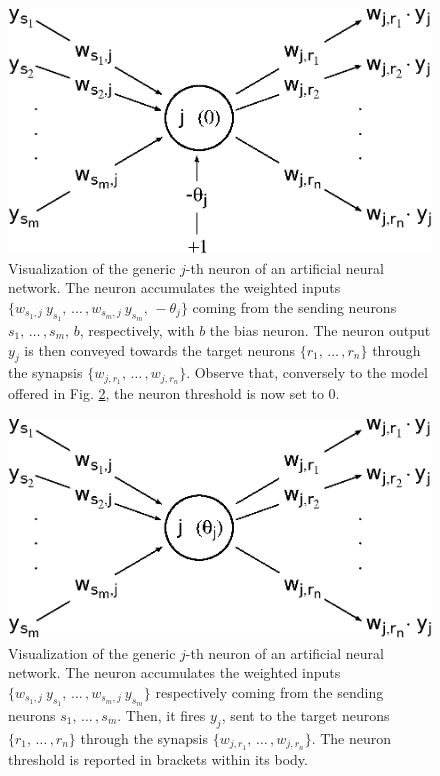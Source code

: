 \documentclass{elsarticle}
\numberwithin{equation}{section}
\theoremstyle{theorem}
\theoremstyle{definition}
\theoremstyle{remark}
\theoremstyle{proposition}
\numberwithin{figure}{section}
\begin{document}
		\begin{figure}[H]
			\center
			\includegraphics[scale = 0.6]{neural_model_bias.eps}
			
			\caption{Visualization of the generic $j$-th neuron of an artificial neural network. The neuron accumulates the weighted inputs $\big\lbrace w_{s_1,j} ~ y_{s_1}, \, \ldots \, , w_{s_m,j} ~ y_{s_m}, \, -\theta_j \big\rbrace$ coming from the sending neurons $s_1, \, \ldots \, , s_m, \, b$, respectively, with $b$ the bias neuron. The neuron output $y_j$ is then conveyed towards the target neurons $\big\lbrace r_1, \, \ldots \, , r_n \big\rbrace$ through the synapsis $\big\lbrace w_{j,r_1}, \, \ldots \, , w_{j,r_n} \big\rbrace$. Observe that, conversely to the model offered in Fig. \ref{fig:neural-model}, the neuron threshold is now set to $0$.} 
			\label{fig:neural-model-bias}
		\end{figure}
		\fi
		
		\begin{figure}[t]
			\center
			\includegraphics[scale = 0.55]{neural_model_ter.eps}
			
			\caption{Visualization of the generic $j$-th neuron of an artificial neural network. The neuron accumulates the weighted inputs $\big\lbrace w_{s_1,j} ~ y_{s_1}, \, \ldots \, , w_{s_m,j} ~ y_{s_m} \big\rbrace$ respectively coming from the sending neurons $s_1, \, \ldots \, , s_m$. Then, it fires $y_j$, sent to the target neurons $\big\lbrace r_1, \, \ldots \, , r_n \big\rbrace$ through the synapsis $\big\lbrace w_{j,r_1}, \, \ldots \, , w_{j,r_n} \big\rbrace$. The neuron threshold is reported in brackets within its body.} 
			\label{fig:neural-model}
		\end{figure}
		
\end{document}
